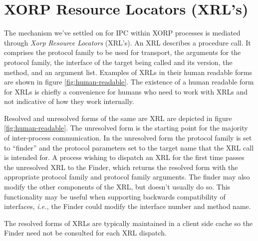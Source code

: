 \documentclass[11pt]{article}
\newcommand{\ie}{\emph{i.e.,}\xspace}
\begin{document}
\section{XORP Resource Locators (XRL's)}

The mechanism we've settled on for IPC within XORP processes is mediated
through \emph{Xorp Resource Locators} (XRL's).  An XRL describes a
procedure call.  It comprises the protocol family to be used for
transport, the arguments for the protocol family, the interface of the
target being called and its version, the method, and an argument
list.  Examples of XRLs in their human readable forms are shown in
figure \ref{fig:human-readable}.  The existence of a human readable
form for XRLs is chiefly a convenience for humans who need to work
with XRLs and not indicative of how they work internally.

Resolved and unresolved forms of the same are XRL are depicted in
figure \ref{fig:human-readable}.  The unresolved form is the starting
point for the majority of inter-process communication.  In the
unresolved form the protocol family is set to ``finder'' and the
protocol parameters set to the target name that the XRL call is
intended for.  A process wishing to dispatch an XRL for the first time
passes the unresolved XRL to the Finder, which returns the resolved
form with the appropriate protocol family and protocol family
arguments.  The finder may also modify the other components of the
XRL, but doesn't usually do so.  This functionality may be useful when
supporting backwards compatibility of interfaces, \ie the Finder could
modify the interface number and method name.

The resolved forms of XRLs are typically maintained in a client side
cache so the Finder need not be consulted for each XRL dispatch.
\end{document}
